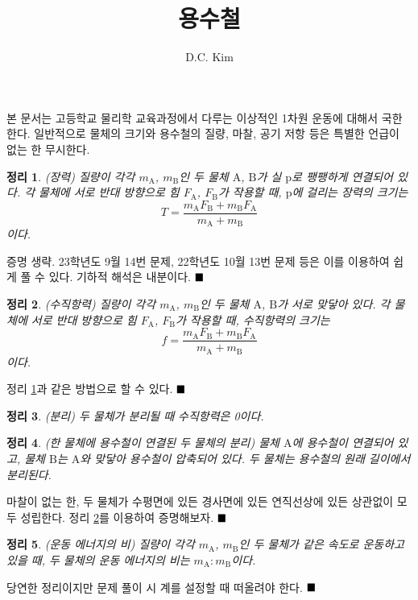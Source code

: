 \documentclass{article}
\newtheorem{theorem}{정리}
\newcommand{\qed}{$\hfill\blacksquare$}
\begin{document}
\title{용수철}
\author{D.C. Kim}
\maketitle

본 문서는 고등학교 물리학 교육과정에서 다루는 이상적인 1차원 운동에 대해서 국한한다. 일반적으로 물체의 크기와 용수철의 질량, 마찰, 공기 저항 등은 특별한 언급이 없는 한 무시한다.

\begin{theorem}\label{theorem:1}
(장력) 질량이 각각 $m_\mathrm{A}$, $m_{\mathrm{B}}$인 두 물체 $\mathrm{A}$, $\mathrm{B}$가 실 $\mathrm{p}$로 팽팽하게 연결되어 있다. 각 물체에 서로 반대 방향으로 힘 $F_\mathrm{A}$, $F_\mathrm{B}$가 작용할 때, $\mathrm{p}$에 걸리는 장력의 크기는
\begin{equation}
	T = \frac{m_\mathrm{A}F_\mathrm{B} + m_\mathrm{B}F_\mathrm{A}}{m_\mathrm{A} + m_\mathrm{B}}
\end{equation}
이다.
\end{theorem}
증명 생략. 23학년도 9월 14번 문제, 22학년도 10월 13번 문제 등은 이를 이용하여 쉽게 풀 수 있다. 기하적 해석은 내분이다.
\qed

\begin{theorem}\label{theorem:2}
	(수직항력) 질량이 각각 $m_\mathrm{A}$, $m_{\mathrm{B}}$인 두 물체 $\mathrm{A}$, $\mathrm{B}$가 서로 맞닿아 있다. 각 물체에 서로 반대 방향으로 힘 $F_\mathrm{A}$, $F_\mathrm{B}$가 작용할 때, 수직항력의 크기는
	\begin{equation}
		f=\frac{m_\mathrm{A}F_\mathrm{B} + m_\mathrm{B}F_\mathrm{A}}{m_\mathrm{A} + m_\mathrm{B}}
	\end{equation}
	이다.
\end{theorem}
정리 \ref{theorem:1}과 같은 방법으로 할 수 있다.
\qed

\begin{theorem}
	(분리) 두 물체가 분리될 때 수직항력은 0이다.
\end{theorem}

\begin{theorem}
	(한 물체에 용수철이 연결된 두 물체의 분리) 물체 $\mathrm{A}$에 용수철이 연결되어 있고, 물체 $\mathrm{B}$는 $\mathrm{A}$와 맞닿아 용수철이 압축되어 있다. 두 물체는 용수철의 원래 길이에서 분리된다.
\end{theorem}
마찰이 없는 한, 두 물체가 수평면에 있든 경사면에 있든 연직선상에 있든 상관없이 모두 성립한다. 정리 \ref{theorem:2}를 이용하여 증명해보자.
\qed


\begin{theorem}
	(운동 에너지의 비) 질량이 각각 $m_\mathrm{A}$, $m_{\mathrm{B}}$인 두 물체가 같은 속도로 운동하고 있을 때, 두 물체의 운동 에너지의 비는 $m_\mathrm{A} : m_\mathrm{B}$이다.
\end{theorem}
당연한 정리이지만 문제 풀이 시 계를 설정할 때 떠올려야 한다.
\qed
\end{document}

